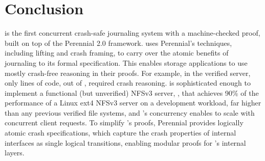 \section{Conclusion}
\label{sec:concl}

\txn is the first concurrent crash-safe journaling
system with a machine-checked proof, built on top of the Perennial 2.0 framework.
\txn uses Perennial's techniques, including lifting and crash framing, to
carry over the atomic benefits of journaling to its formal specification.
This enables storage applications to use mostly crash-free reasoning in
their proofs.  For example, in the verified \simplenfs server, only \simplenfsCrashLOC{}
lines of code, out of \simplenfsLOC{}, required crash reasoning.  \txn is sophisticated
enough to implement a functional (but unverified) NFSv3 server, \gnfs, that achieves
90\% of the performance of a Linux ext4 NFSv3 server on a development workload, far higher than
any previous verified file systems, and \txn's concurrency enables \gnfs
to scale with concurrent client requests.  To simplify \txn's proofs,
Perennial provides logically atomic crash specifications, which capture the
crash properties of internal interfaces as single logical transitions,
enabling modular proofs for \txn's internal layers.

